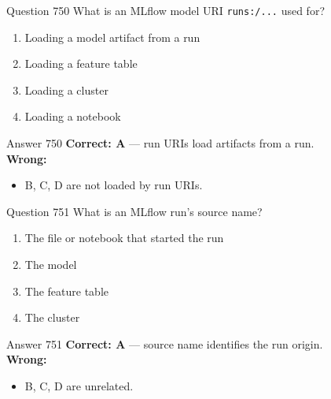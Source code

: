 \documentclass[aspectratio=169,11pt]{beamer}
\begin{document}
	\begin{frame}{Question 750}
		What is an MLflow model URI \texttt{runs:/...} used for?
		\begin{enumerate}[label=\Alph*.]
			\item Loading a model artifact from a run
			\item Loading a feature table
			\item Loading a cluster
			\item Loading a notebook
		\end{enumerate}
	\end{frame}
	\begin{frame}{Answer 750}
		\textbf{Correct: A} --- run URIs load artifacts from a run.\\
		\vspace{0.5em}
		\textbf{Wrong:}
		\begin{itemize}
			\item B, C, D are not loaded by run URIs.
		\end{itemize}
	\end{frame}
	
	\begin{frame}{Question 751}
		What is an MLflow run's source name?
		\begin{enumerate}[label=\Alph*.]
			\item The file or notebook that started the run
			\item The model
			\item The feature table
			\item The cluster
		\end{enumerate}
	\end{frame}
	\begin{frame}{Answer 751}
		\textbf{Correct: A} --- source name identifies the run origin.\\
		\vspace{0.5em}
		\textbf{Wrong:}
		\begin{itemize}
			\item B, C, D are unrelated.
		\end{itemize}
	\end{frame}
	
\end{document}
